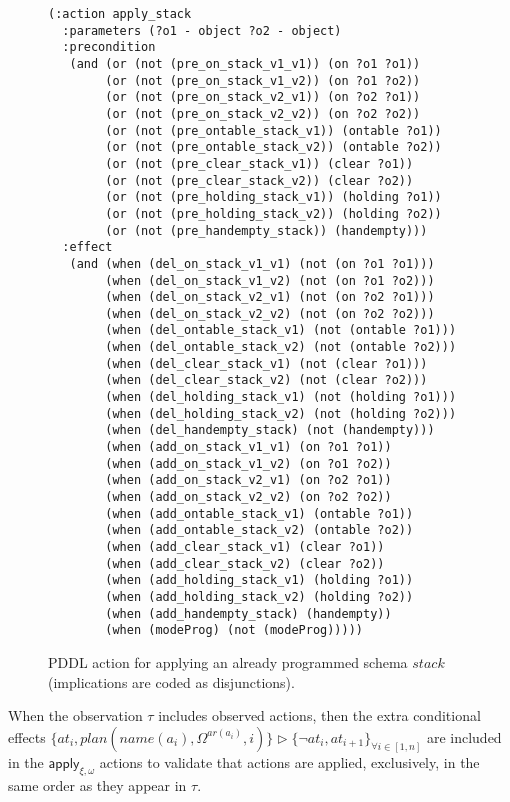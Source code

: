 \documentclass[letterpaper]{article} %
\begin{document}
\begin{itemize}
\begin{enumerate}
\begin{figure}
\begin{scriptsize}
\begin{verbatim}
(:action apply_stack
  :parameters (?o1 - object ?o2 - object)
  :precondition
   (and (or (not (pre_on_stack_v1_v1)) (on ?o1 ?o1))
        (or (not (pre_on_stack_v1_v2)) (on ?o1 ?o2))
        (or (not (pre_on_stack_v2_v1)) (on ?o2 ?o1))
        (or (not (pre_on_stack_v2_v2)) (on ?o2 ?o2))
        (or (not (pre_ontable_stack_v1)) (ontable ?o1))
        (or (not (pre_ontable_stack_v2)) (ontable ?o2))
        (or (not (pre_clear_stack_v1)) (clear ?o1))
        (or (not (pre_clear_stack_v2)) (clear ?o2))
        (or (not (pre_holding_stack_v1)) (holding ?o1))
        (or (not (pre_holding_stack_v2)) (holding ?o2))
        (or (not (pre_handempty_stack)) (handempty)))
  :effect
   (and (when (del_on_stack_v1_v1) (not (on ?o1 ?o1)))
        (when (del_on_stack_v1_v2) (not (on ?o1 ?o2)))
        (when (del_on_stack_v2_v1) (not (on ?o2 ?o1)))
        (when (del_on_stack_v2_v2) (not (on ?o2 ?o2)))
        (when (del_ontable_stack_v1) (not (ontable ?o1)))
        (when (del_ontable_stack_v2) (not (ontable ?o2)))
        (when (del_clear_stack_v1) (not (clear ?o1)))
        (when (del_clear_stack_v2) (not (clear ?o2)))
        (when (del_holding_stack_v1) (not (holding ?o1)))
        (when (del_holding_stack_v2) (not (holding ?o2)))
        (when (del_handempty_stack) (not (handempty)))
        (when (add_on_stack_v1_v1) (on ?o1 ?o1))
        (when (add_on_stack_v1_v2) (on ?o1 ?o2))
        (when (add_on_stack_v2_v1) (on ?o2 ?o1))
        (when (add_on_stack_v2_v2) (on ?o2 ?o2))
        (when (add_ontable_stack_v1) (ontable ?o1))
        (when (add_ontable_stack_v2) (ontable ?o2))
        (when (add_clear_stack_v1) (clear ?o1))
        (when (add_clear_stack_v2) (clear ?o2))
        (when (add_holding_stack_v1) (holding ?o1))
        (when (add_holding_stack_v2) (holding ?o2))
        (when (add_handempty_stack) (handempty))
        (when (modeProg) (not (modeProg)))))
\end{verbatim}
\end{scriptsize}
 \caption{\small PDDL action for applying an already programmed schema $stack$ (implications are coded as disjunctions).}
\label{fig:compilation}
\end{figure}
When the observation $\tau$ includes observed actions, then the extra conditional effects $\{at_{i},plan(name(a_i),\Omega^{ar(a_i)},i)\}\rhd\{\neg at_{i},at_{i+1}\}_{\forall i\in [1,n]}$ are included in the $\mathsf{apply_{\xi,\omega}}$ actions to validate that actions are applied, exclusively, in the same order as they appear in $\tau$.\\


\end{enumerate}
\end{itemize}
\end{document}
